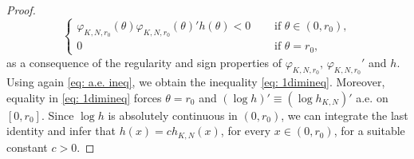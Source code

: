 \documentclass[12pt]{article}
\theoremstyle{plain}
\theoremstyle{definition}
\begin{document}
\begin{proof}
\[\begin{cases}
 \varphi_{K,N,r_0}(\theta)\varphi_{K,N,r_0}(\theta)'h(\theta)<0 \quad &\textrm{ if } \theta\in (0,r_0),   \\
 0 &\textrm{ if } \theta=r_0,
 \end{cases}
\]
as a consequence of the regularity and sign properties of $\varphi_{K,N,r_0}, \, \varphi_{K,N,r_0}'$ and $h$. 
Using again \eqref{eq: a.e. ineq}, we obtain the inequality \eqref{eq: 1dimineq}. Moreover, equality in \eqref{eq: 1dimineq} forces $\theta=r_0$ and $(\log{h})' \equiv (\log{h_{K,N}})'$ a.e. on $[0,r_0]$. Since $\log{h}$ is absolutely continuous in $(0,r_0)$, we can integrate the last identity and infer that $h(x)=ch_{K,N}(x)$, for every $x\in (0,r_0)$, for a suitable constant $c>0$.

\end{proof}
\end{document}
